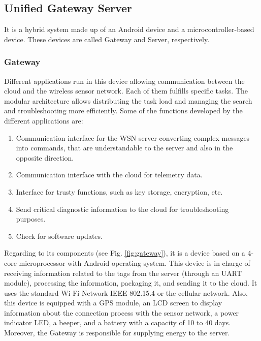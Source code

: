\documentclass[journal]{IEEEtran}	%
\begin{document}
\subsection{Unified Gateway Server}


It is a hybrid system made up of an Android device and a microcontroller-based device. These devices are called Gateway and Server, respectively.


\subsubsection{Gateway}
\label{sec:gateway}


Different applications run in this device allowing communication between the cloud and the wireless sensor network. Each of them fulfills specific tasks. The modular architecture allows distributing the task load and managing the search and troubleshooting more efficiently. Some of the functions developed by the different applications are:

\begin{enumerate}

\item Communication interface for the WSN server converting complex messages into commands, that are understandable to the server and also in the opposite direction.
\item Communication interface with the cloud for telemetry data.
\item Interface for trusty functions, such as key storage, encryption, etc.
\item Send critical diagnostic information to the cloud for troubleshooting purposes.
\item Check for software updates.
\end{enumerate}

Regarding to its components (see Fig. \ref{fig:gateway}), it is a device based on a 4-core microprocessor with Android operating system. This device is in charge of receiving information related to the tags from the server (through an UART module), processing the information, packaging it, and sending it to the cloud. It uses the standard Wi-Fi Network IEEE 802.15.4 or the cellular network. Also, this device is equipped with a GPS module, an LCD screen to display information about the connection process with the sensor network, a power indicator LED, a beeper, and a battery with a capacity of 10 to 40 days. Moreover, the Gateway is responsible for supplying energy to the server.
\end{document}
